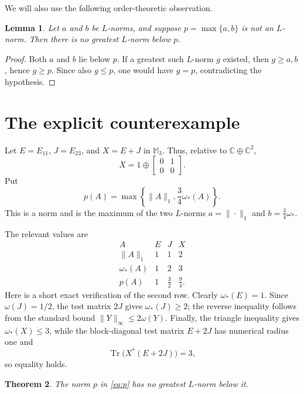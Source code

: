 \documentclass[11pt]{article}
\newtheorem{theorem}{Theorem}
\newtheorem{lemma}[theorem]{Lemma}
\newcommand{\Mn}{\mathbb M_3}
\newcommand{\tr}{\operatorname{Tr}}
\begin{document}
We will also use the following order-theoretic observation.

\begin{lemma}\label{lem:obstruction}
Let $a$ and $b$ be $L$-norms, and suppose $p=\max\{a,b\}$ is not an
$L$-norm.  Then there is no greatest $L$-norm below $p$.
\end{lemma}

\begin{proof}
Both $a$ and $b$ lie below $p$.  If a greatest such $L$-norm $g$ existed,
then $g\geq a,b$, hence $g\geq p$.  Since also $g\leq p$, one would have
$g=p$, contradicting the hypothesis.
\end{proof}

\section{The explicit counterexample}

Let $E=E_{11}$, $J=E_{23}$, and $X=E+J$ in $\Mn$.  Thus, relative to
$\mathbb C\oplus\mathbb C^2$,
\[
 X=1\oplus\begin{bmatrix}0&1\\0&0\end{bmatrix}.
\]
Put
\begin{equation}\label{eq:p}
 p(A)=\max\left\{\|A\|_1,\frac34\omega_*(A)\right\}.
\end{equation}
This is a norm and is the maximum of the two $L$-norms
$a=\|\cdot\|_1$ and $b=\tfrac34\omega_*$.

The relevant values are
\begin{equation}\label{eq:values}
\begin{array}{c|ccc}
 A&E&J&X\\ \hline
 \|A\|_1&1&1&2\\
 \omega_*(A)&1&2&3\\
 p(A)&1&\tfrac32&\tfrac94.
\end{array}
\end{equation}
Here is a short exact verification of the second row.  Clearly
$\omega_*(E)=1$.  Since $\omega(J)=1/2$, the test matrix $2J$ gives
$\omega_*(J)\geq2$; the reverse inequality follows from the standard bound
$\|Y\|_\infty\leq2\omega(Y)$.  Finally, the triangle inequality gives
$\omega_*(X)\leq3$, while the block-diagonal test matrix $E+2J$ has numerical
radius one and
\[
 \tr\bigl(X^*(E+2J)\bigr)=3,
\]
so equality holds.

\begin{theorem}\label{thm:counterexample}
The norm $p$ in \eqref{eq:p} has no greatest $L$-norm below it.
\end{theorem}
\end{document}

